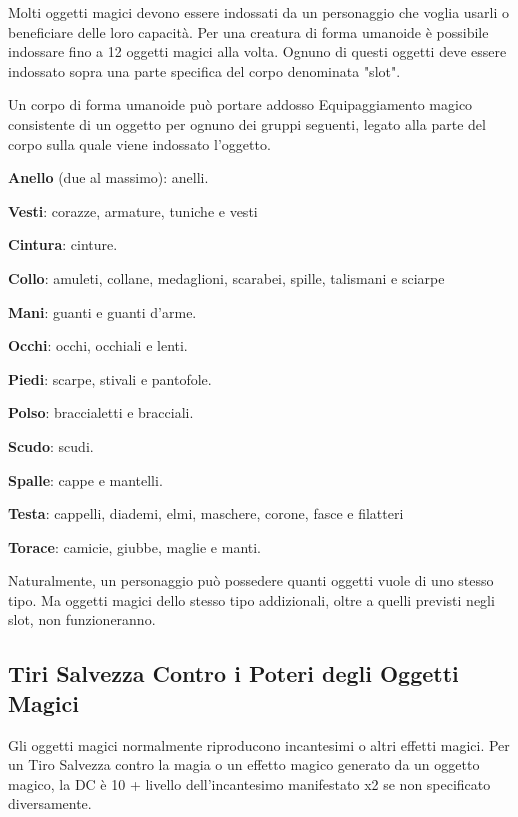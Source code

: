 \begin{multicols}{2}
\label{oggetti-magici-sul-corpo}

Molti oggetti magici devono essere indossati da un personaggio che voglia usarli o beneficiare delle loro capacità. Per una creatura di forma umanoide è possibile indossare fino a 12 oggetti magici alla volta. Ognuno di questi oggetti deve essere indossato sopra una parte specifica del corpo denominata "slot".

Un corpo di forma umanoide può portare addosso Equipaggiamento magico consistente di un oggetto per ognuno dei gruppi seguenti, legato alla parte del corpo sulla quale viene indossato l'oggetto.

\textbf{Anello} (due al massimo): anelli.

\textbf{Vesti}: corazze, armature, tuniche e vesti

\textbf{Cintura}: cinture.

\textbf{Collo}: amuleti, collane, medaglioni, scarabei, spille, talismani e sciarpe

\textbf{Mani}: guanti e guanti d'arme.

\textbf{Occhi}: occhi, occhiali e lenti.

\textbf{Piedi}: scarpe, stivali e pantofole.

\textbf{Polso}: braccialetti e bracciali.

\textbf{Scudo}: scudi.

\textbf{Spalle}: cappe e mantelli.

\textbf{Testa}: cappelli, diademi, elmi, maschere, corone, fasce e filatteri

\textbf{Torace}: camicie, giubbe, maglie e manti.

\medskip

Naturalmente, un personaggio può possedere quanti oggetti vuole di uno stesso tipo. Ma oggetti magici dello stesso tipo addizionali, oltre a quelli previsti negli slot, non funzioneranno.

\subsection{Tiri Salvezza Contro i Poteri degli Oggetti Magici}

\label{tiri-salvezza-contro-i-poteri-degli-oggetti-magici}

Gli oggetti magici normalmente riproducono incantesimi o altri effetti magici. Per un Tiro Salvezza contro la magia o un effetto magico generato da un oggetto magico, la DC è 10 + livello dell'incantesimo manifestato x2 se non specificato diversamente.


\end{multicols}
